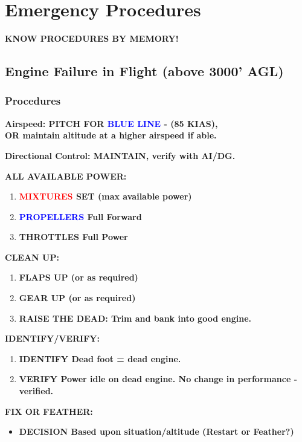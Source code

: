 
\chapter{Emergency Procedures}

\textbf{KNOW PROCEDURES BY MEMORY!}

\section{Engine Failure in Flight (above 3000' AGL)}

\subsection{Procedures}
\textbf{Airspeed: PITCH FOR \textcolor{blue}{BLUE LINE} - \vyse (85 KIAS),\\OR maintain altitude at a higher airspeed if able.}

\textbf{Directional Control: MAINTAIN, verify with AI/DG.}

\textbf{ALL AVAILABLE POWER:}
\begin{enumerate}
    \item \textbf{\textcolor{red}{MIXTURES} SET (max available power)}
    \item \textbf{\textcolor{blue}{PROPELLERS} Full Forward}
    \item \textbf{THROTTLES Full Power}
\end{enumerate}

\textbf{CLEAN UP:}
\begin{enumerate}
    \item \textbf{FLAPS UP (or as required)}
    \item \textbf{GEAR UP (or as required)}
    \item \textbf{RAISE THE DEAD: Trim and bank into good engine.}
\end{enumerate}

\textbf{IDENTIFY/VERIFY:}
\begin{enumerate}
    \item \textbf{IDENTIFY Dead foot = dead engine.}
    \item \textbf{VERIFY Power idle on dead engine. No change in performance - verified.}
\end{enumerate}

\textbf{FIX OR FEATHER:}
\begin{itemize}
    \item \textbf{DECISION Based upon situation/altitude (Restart or Feather?)}
\end{itemize}

